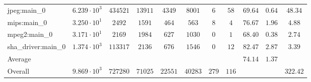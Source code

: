 \begin{tabular}{|l|c|c|c|c|c|c|c|c|c|c|}
jpeg:main\_0            & $ 6.239 \cdot 10^{3} $ & $ 434521 $ & $ 13911 $ & $ 4349  $ & $ 8001  $ & $ 6   $ & $ 58  $ & $ 69.64       $ & $ 0.64    $ & $ 48.34   $ \\
mips:main\_0            & $ 3.250 \cdot 10^{1} $ & $ 2492   $ & $ 1591  $ & $ 464   $ & $ 563   $ & $ 8   $ & $ 4   $ & $ 76.67       $ & $ 1.96    $ & $ 4.88    $ \\
mpeg2:main\_0           & $ 3.171 \cdot 10^{1} $ & $ 2169   $ & $ 1984  $ & $ 627   $ & $ 1030  $ & $ 0   $ & $ 1   $ & $ 68.40       $ & $ 0.38    $ & $ 2.74    $ \\
sha\_driver:main\_0     & $ 1.374 \cdot 10^{3} $ & $ 113317 $ & $ 2136  $ & $ 676   $ & $ 1546  $ & $ 0   $ & $ 12  $ & $ 82.47       $ & $ 2.87    $ & $ 3.39    $ \\
\hline
Average                 & $                    $ & $        $ & $       $ & $       $ & $       $ & $     $ & $     $ & $ 74.14       $ & $ 1.37    $ & $         $ \\
\hline
Overall                 & $ 9.869 \cdot 10^{3} $ & $ 727280 $ & $ 71025 $ & $ 22551 $ & $ 40283 $ & $ 279 $ & $ 116 $ & $             $ & $         $ & $ 322.42  $ \\
\hline
\end{tabular}
